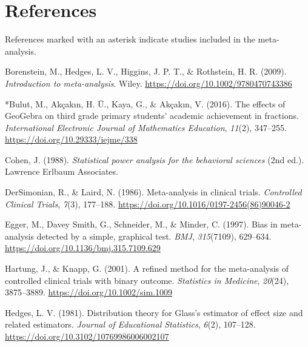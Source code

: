\documentclass[man,a4paper,12pt,floatsintext,nolmodern,notab]{apa7}
\begin{document}
\section{References}
\noindent References marked with an asterisk indicate studies included in the meta-analysis.\par
\par\noindent\hangindent=0.5in Borenstein, M., Hedges, L. V., Higgins, J. P. T., \& Rothstein, H. R. (2009). \textit{Introduction to meta-analysis}. Wiley. \url{https://doi.org/10.1002/9780470743386}\par
\par\noindent\hangindent=0.5in *Bulut, M., Akçakın, H. Ü., Kaya, G., \& Akçakın, V. (2016). The effects of GeoGebra on third grade primary students’ academic achievement in fractions. \textit{International Electronic Journal of Mathematics Education}, \textit{11}(2), 347–255. \url{https://doi.org/10.29333/iejme/338}\par
\par\noindent\hangindent=0.5in Cohen, J. (1988). \textit{Statistical power analysis for the behavioral sciences} (2nd ed.). Lawrence Erlbaum Associates.\par
\par\noindent\hangindent=0.5in DerSimonian, R., \& Laird, N. (1986). Meta-analysis in clinical trials. \textit{Controlled Clinical Trials}, \textit{7}(3), 177–188. \url{https://doi.org/10.1016/0197-2456(86)90046-2}\par
\par\noindent\hangindent=0.5in Egger, M., Davey Smith, G., Schneider, M., \& Minder, C. (1997). Bias in meta-analysis detected by a simple, graphical test. \textit{BMJ}, \textit{315}(7109), 629–634. \url{https://doi.org/10.1136/bmj.315.7109.629}\par
\par\noindent\hangindent=0.5in Hartung, J., \& Knapp, G. (2001). A refined method for the meta-analysis of controlled clinical trials with binary outcome. \textit{Statistics in Medicine}, \textit{20}(24), 3875–3889. \url{https://doi.org/10.1002/sim.1009}\par
\par\noindent\hangindent=0.5in Hedges, L. V. (1981). Distribution theory for Glass's estimator of effect size and related estimators. \textit{Journal of Educational Statistics}, \textit{6}(2), 107–128. \url{https://doi.org/10.3102/10769986006002107}\par
\end{document}

